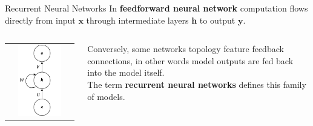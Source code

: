 \documentclass[aspectratio=169]{beamer}
\begin{document}
\begin{frame}{Recurrent Neural Networks}
In \textbf{feedforward neural network} computation flows directly from input $\bm{x}$ through intermediate layers $\bm{h}$ to output $\bm{y}$.\\
\vspace{0.5cm}
\begin{columns}
\begin{column}{0.3\textwidth}
\begin{tabular}{c}
	\includegraphics[width=0.7\textwidth]{img/rnn/vanilla_rnn.png}
\end{tabular}
\end{column}
\begin{column}{0.7\textwidth}
Conversely, some networks topology feature feedback connections, in other words model outputs are fed back into the model itself.\\
\vspace{0.5cm}
The term \textbf{recurrent neural networks} defines this family of models.
\end{column}
\end{columns}

\end{frame}
\end{document}
